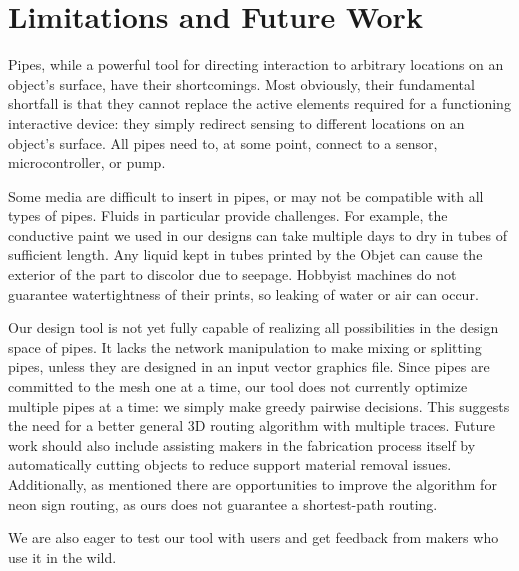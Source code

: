 \section{Limitations and Future Work}
Pipes, while a powerful tool for directing interaction to arbitrary locations on an object's surface, have their shortcomings.  Most obviously, their fundamental shortfall is that they cannot replace the active elements required for a functioning interactive device: they simply redirect sensing to different locations on an object's surface.  All pipes need to, at some point, connect to a sensor, microcontroller, or pump.

Some media are difficult to insert in pipes, or may not be compatible with all types of pipes.  Fluids in particular provide challenges.  For example, the conductive paint we used in our designs can take multiple days to dry in tubes of sufficient length.  Any liquid kept in tubes printed by the Objet can cause the exterior of the part to discolor due to seepage.  Hobbyist machines do not guarantee watertightness of their prints, so leaking of water or air can occur.


Our design tool is not yet fully capable of realizing all possibilities in the design space of pipes.  It lacks the network manipulation to make mixing or splitting pipes, unless they are designed in an input vector graphics file.  Since pipes are committed to the mesh one at a time, our tool does not currently optimize multiple pipes at a time: we simply make greedy pairwise decisions.  This suggests the need for a better general 3D routing algorithm with multiple traces.  Future work should also include assisting makers in the fabrication process itself by automatically cutting objects to reduce support material removal issues.  Additionally, as mentioned there are opportunities to improve the algorithm for neon sign routing, as ours does not guarantee a shortest-path routing.

We are also eager to test our tool with users and get feedback from makers who use it in the wild.